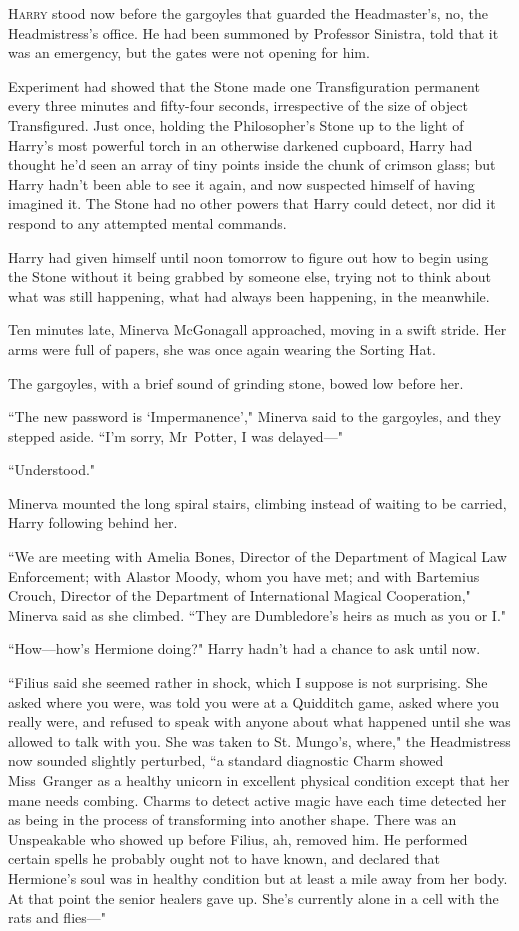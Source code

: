 
\lettrine{H}{arry} stood now before the gargoyles that guarded the Headmaster's, no, the Headmistress's office. He had been summoned by Professor Sinistra, told that it was an emergency, but the gates were not opening for him.

Experiment had showed that the Stone made one Transfiguration permanent every three minutes and fifty-four seconds, irrespective of the size of object Transfigured. Just once, holding the Philosopher's Stone up to the light of Harry's most powerful torch in an otherwise darkened cupboard, Harry had thought he'd seen an array of tiny points inside the chunk of crimson glass; but Harry hadn't been able to see it again, and now suspected himself of having imagined it. The Stone had no other powers that Harry could detect, nor did it respond to any attempted mental commands.

Harry had given himself until noon tomorrow to figure out how to begin using the Stone without it being grabbed by someone else, trying not to think about what was still happening, what had always been happening, in the meanwhile.

Ten minutes late, Minerva McGonagall approached, moving in a swift stride. Her arms were full of papers, she was once again wearing the Sorting Hat.

The gargoyles, with a brief sound of grinding stone, bowed low before her.

``The new password is `Impermanence'," Minerva said to the gargoyles, and they stepped aside. ``I'm sorry, Mr~Potter, I was delayed—"

``Understood."

Minerva mounted the long spiral stairs, climbing instead of waiting to be carried, Harry following behind her.

``We are meeting with Amelia Bones, Director of the Department of Magical Law Enforcement; with Alastor Moody, whom you have met; and with Bartemius Crouch, Director of the Department of International Magical Cooperation," Minerva said as she climbed. ``They are Dumbledore's heirs as much as you or I."

``How—how's Hermione doing?" Harry hadn't had a chance to ask until now.

``Filius said she seemed rather in shock, which I suppose is not surprising. She asked where you were, was told you were at a Quidditch game, asked where you really were, and refused to speak with anyone about what happened until she was allowed to talk with you. She was taken to St. Mungo's, where," the Headmistress now sounded slightly perturbed, ``a standard diagnostic Charm showed Miss~Granger as a healthy unicorn in excellent physical condition except that her mane needs combing. Charms to detect active magic have each time detected her as being in the process of transforming into another shape. There was an Unspeakable who showed up before Filius, ah, removed him. He performed certain spells he probably ought not to have known, and declared that Hermione's soul was in healthy condition but at least a mile away from her body. At that point the senior healers gave up. She's currently alone in a cell with the rats and flies—"

